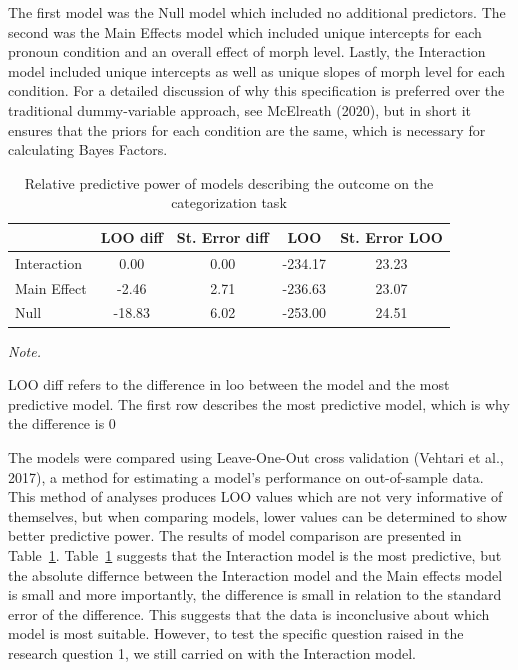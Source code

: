 \documentclass[
  man]{apa7}
\begin{document}
The first model was the Null model which included no additional predictors. The second was the Main Effects model which included unique intercepts for each pronoun condition and an overall effect of morph level. Lastly, the Interaction model included unique intercepts as well as unique slopes of morph level for each condition. For a detailed discussion of why this specification is preferred over the traditional dummy-variable approach, see McElreath (2020), but in short it ensures that the priors for each condition are the same, which is necessary for calculating Bayes Factors.

\begin{table}

\caption{\label{tab:loo}Relative predictive power of models describing the outcome on the categorization task}
\centering
\begin{threeparttable}
\begin{tabular}[t]{lcccc}
\toprule
  & LOO diff & St. Error diff & LOO & St. Error LOO\\
\midrule
Interaction & 0.00 & 0.00 & -234.17 & 23.23\\
Main Effect & -2.46 & 2.71 & -236.63 & 23.07\\
Null & -18.83 & 6.02 & -253.00 & 24.51\\
\bottomrule
\end{tabular}
\begin{tablenotes}[para]
\item \textit{Note.} 
\item LOO diff refers to the difference in loo between the model and the most predictive model. The first row describes the most predictive model, which is why the difference is 0
\end{tablenotes}
\end{threeparttable}
\end{table}

The models were compared using Leave-One-Out cross validation (Vehtari et al., 2017), a method for estimating a model's performance on out-of-sample data. This method of analyses produces LOO values which are not very informative of themselves, but when comparing models, lower values can be determined to show better predictive power. The results of model comparison are presented in Table~\ref{tab:loo}.
Table~\ref{tab:loo} suggests that the Interaction model is the most predictive, but the absolute differnce between the Interaction model and the Main effects model is small and more importantly, the difference is small in relation to the standard error of the difference. This suggests that the data is inconclusive about which model is most suitable. However, to test the specific question raised in the research question 1, we still carried on with the Interaction model.
\end{document}
